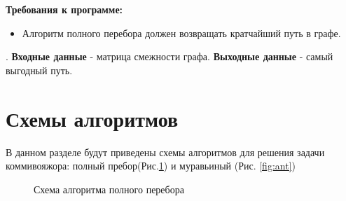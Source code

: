 \documentclass[12pt]{report}
\begin{document}
\textbf{Требования к программе:}
\begin{itemize}
	\item Алгоритм полного перебора должен возвращать кратчайший путь в графе.
\end{itemize}
.  
\newline  
\textbf{Входные данные} - матрица смежности графа.  
\newline
\textbf{Выходные данные} - самый выгодный путь.

\section{Схемы алгоритмов}
В данном разделе будут приведены схемы алгоритмов для решения задачи коммивояжора:
полный пребор(Рис.\ref{fig:f_p}) и муравьиный (Рис. \ref{fig:ant})\\

\newpage
\begin{figure}[h]
	\caption{Схема алгоритма полного перебора}
	\label{fig:f_p}
\end{figure}
\newpage   
\end{document}
